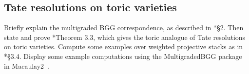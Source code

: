 \documentclass[11pt]{amsart}
\numberwithin{equation}{section}
\theoremstyle{definition}
\theoremstyle{remark}
\begin{document}
\subsection{Tate resolutions on toric varieties}
Briefly explain the multigraded BGG correspondence, as described in \cite{BE24b}*{\S 2}. Then state and prove \cite{BE24b}*{Theorem 3.3}, which gives the toric analogue of Tate resolutions on toric varieties. Compute some examples over weighted projective stacks as in \cite{BE24b}*{\S 3.4}. Display some example computations using the MultigradedBGG package in Macaulay2~\cite{BBG+25}. 

\medskip





\end{document}
